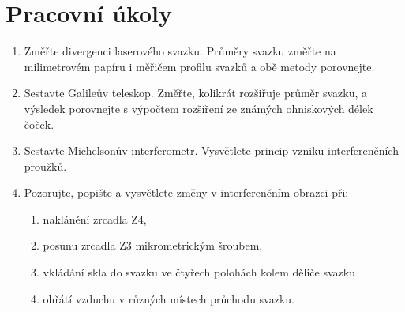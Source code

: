 \documentclass[a4paper]{article}
\author{Vladislav Wohlrath}
\begin{document}
\begin{titlepage}

\end{titlepage}

\section*{Pracovní úkoly}
\begin{enumerate}
\item Změřte divergenci laserového svazku. Průměry svazku změřte na milimetrovém papíru i měřičem profilu svazků a obě metody porovnejte.
\item Sestavte Galileův teleskop. Změřte, kolikrát rozšiřuje průměr svazku, a výsledek porovnejte s výpočtem rozšíření ze známých ohniskových délek čoček.
\item Sestavte Michelsonův interferometr. Vysvětlete princip vzniku interferenčních proužků.
\item Pozorujte, popište a vysvětlete změny v interferenčním obrazci při:
        \begin{enumerate}
        \item naklánění zrcadla Z4,
        \item posunu zrcadla Z3 mikrometrickým šroubem,
        \item vkládání skla do svazku ve čtyřech polohách kolem děliče svazku
        \item ohřátí vzduchu v různých místech průchodu svazku.
        \end{enumerate}

\end{enumerate}










\printbibliography[title={Seznam použité literatury}]
\end{document}
